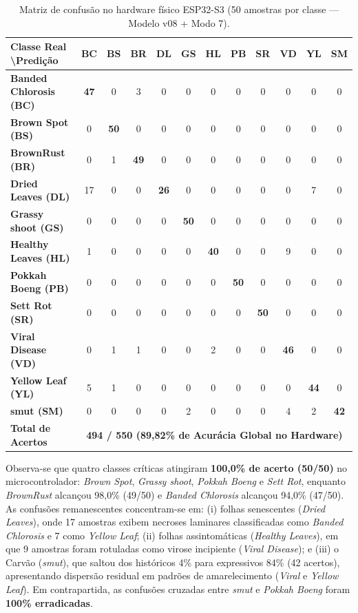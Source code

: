 \begin{table}[H]
\centering
\scriptsize
\setlength{\tabcolsep}{3pt}
\caption{Matriz de confusão no hardware físico ESP32-S3 (50 amostras por classe — Modelo v08 + Modo 7).}
\label{tab:matriz_confusao}
\begin{tabular}{lccccccccccc}
\toprule
\textbf{Classe Real \textbackslash Predição} & \textbf{BC} & \textbf{BS} & \textbf{BR} & \textbf{DL} & \textbf{GS} & \textbf{HL} & \textbf{PB} & \textbf{SR} & \textbf{VD} & \textbf{YL} & \textbf{SM} \\
\midrule
\textbf{Banded Chlorosis (BC)} & \textbf{47} & 0 & 3 & 0 & 0 & 0 & 0 & 0 & 0 & 0 & 0 \\
\textbf{Brown Spot (BS)}       & 0 & \textbf{50} & 0 & 0 & 0 & 0 & 0 & 0 & 0 & 0 & 0 \\
\textbf{BrownRust (BR)}        & 0 & 1 & \textbf{49} & 0 & 0 & 0 & 0 & 0 & 0 & 0 & 0 \\
\textbf{Dried Leaves (DL)}     & 17 & 0 & 0 & \textbf{26} & 0 & 0 & 0 & 0 & 0 & 7 & 0 \\
\textbf{Grassy shoot (GS)}     & 0 & 0 & 0 & 0 & \textbf{50} & 0 & 0 & 0 & 0 & 0 & 0 \\
\textbf{Healthy Leaves (HL)}   & 1 & 0 & 0 & 0 & 0 & \textbf{40} & 0 & 0 & 9 & 0 & 0 \\
\textbf{Pokkah Boeng (PB)}     & 0 & 0 & 0 & 0 & 0 & 0 & \textbf{50} & 0 & 0 & 0 & 0 \\
\textbf{Sett Rot (SR)}         & 0 & 0 & 0 & 0 & 0 & 0 & 0 & \textbf{50} & 0 & 0 & 0 \\
\textbf{Viral Disease (VD)}    & 0 & 1 & 1 & 0 & 0 & 2 & 0 & 0 & \textbf{46} & 0 & 0 \\
\textbf{Yellow Leaf (YL)}      & 5 & 1 & 0 & 0 & 0 & 0 & 0 & 0 & 0 & \textbf{44} & 0 \\
\textbf{smut (SM)}             & 0 & 0 & 0 & 0 & 2 & 0 & 0 & 0 & 4 & 2 & \textbf{42} \\
\midrule
\textbf{Total de Acertos} & \multicolumn{11}{c}{\textbf{494 / 550 (89,82\% de Acurácia Global no Hardware)}} \\
\bottomrule
\end{tabular}
\end{table}

Observa-se que quatro classes críticas atingiram \textbf{100,0\% de acerto (50/50)} no microcontrolador: \textit{Brown Spot}, \textit{Grassy shoot}, \textit{Pokkah Boeng} e \textit{Sett Rot}, enquanto \textit{BrownRust} alcançou 98,0\% (49/50) e \textit{Banded Chlorosis} alcançou 94,0\% (47/50). As confusões remanescentes concentram-se em: (i) folhas senescentes (\textit{Dried Leaves}), onde 17 amostras exibem necroses laminares classificadas como \textit{Banded Chlorosis} e 7 como \textit{Yellow Leaf}; (ii) folhas assintomáticas (\textit{Healthy Leaves}), em que 9 amostras foram rotuladas como virose incipiente (\textit{Viral Disease}); e (iii) o Carvão (\textit{smut}), que saltou dos históricos 4\% para expressivos 84\% (42 acertos), apresentando dispersão residual em padrões de amarelecimento (\textit{Viral} e \textit{Yellow Leaf}). Em contrapartida, as confusões cruzadas entre \textit{smut} e \textit{Pokkah Boeng} foram \textbf{100\% erradicadas}.

